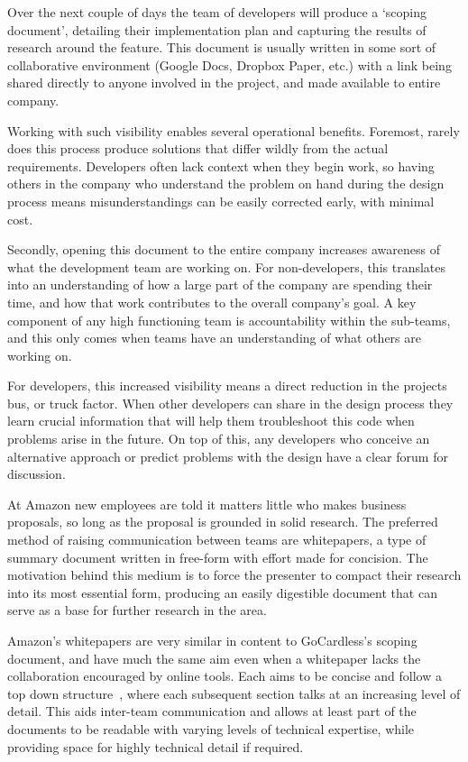 \documentclass[11pt]{article}
\begin{document}
Over the next couple of days the team of developers will produce a ‘scoping
document', detailing their implementation plan and capturing the results of
research around the feature. This document is usually written in some sort of
collaborative environment (Google Docs, Dropbox Paper, etc.) with a link being
shared directly to anyone involved in the project, and made available to entire
company.

Working with such visibility enables several operational benefits. Foremost,
rarely does this process produce solutions that differ wildly from the actual
requirements. Developers often lack context when they begin work, so having
others in the company who understand the problem on hand during the design
process means misunderstandings can be easily corrected early, with minimal
cost\cite{costOfChangeEssay}.

Secondly, opening this document to the entire company increases awareness of
what the development team are working on. For non-developers, this translates
into an understanding of how a large part of the company are spending their
time, and how that work contributes to the overall company's goal. A key
component of any high functioning team is accountability within the
sub-teams\cite{fiveDysfunctions}, and this only comes when teams have an
understanding of what others are working on.

For developers, this increased visibility means a direct reduction in the
projects bus, or truck factor\cite{truckFactor}. When other developers can share
in the design process they learn crucial information that will help them
troubleshoot this code when problems arise in the future. On top of this, any
developers who conceive an alternative approach or predict problems with the
design have a clear forum for discussion.

At Amazon new employees are told it matters little who makes business proposals,
so long as the proposal is grounded in solid research. The preferred method of
raising communication between teams are whitepapers, a type of summary document
written in free-form with effort made for concision. The motivation behind this
medium is to force the presenter to compact their research into its most
essential form, producing an easily digestible document that can serve as a base
for further research in the area.

Amazon's whitepapers are very similar in content to GoCardless's scoping
document, and have much the same aim even when a whitepaper lacks the
collaboration encouraged by online tools. Each aims to be concise and follow a
top down structure~\cite{reportingAndWriting}, where each subsequent section
talks at an increasing level of detail. This aids inter-team communication and
allows at least part of the documents to be readable with varying levels of
technical expertise, while providing space for highly technical detail if
required.
\end{document}
